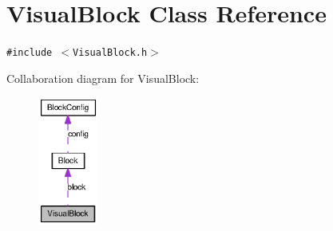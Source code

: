 \hypertarget{classVisualBlock}{
\section{VisualBlock Class Reference}
\label{classVisualBlock}
}
{\tt \#include $<$VisualBlock.h$>$}

Collaboration diagram for VisualBlock:\nopagebreak
\begin{figure}[H]
\begin{center}
\leavevmode
\includegraphics[width=56pt]{classVisualBlock__coll__graph}
\end{center}
\end{figure}
